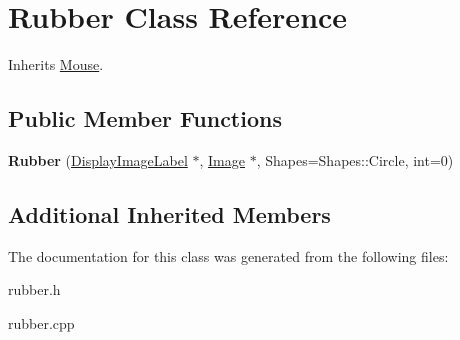 \hypertarget{class_rubber}{}\section{Rubber Class Reference}
\label{class_rubber}


Inherits \mbox{\hyperlink{class_mouse}{Mouse}}.

\subsection*{Public Member Functions}
\begin{DoxyCompactItemize}
\item 
\mbox{\label{class_rubber_ae1376529b6184c7d3a8dceeaf19278b0}} 
{\bfseries Rubber} (\mbox{\hyperlink{class_display_image_label}{Display\+Image\+Label}} $\ast$, \mbox{\hyperlink{class_image}{Image}} $\ast$, Shapes=Shapes\+::\+Circle, int=0)
\end{DoxyCompactItemize}
\subsection*{Additional Inherited Members}


The documentation for this class was generated from the following files\+:\begin{DoxyCompactItemize}
\item 
rubber.\+h\item 
rubber.\+cpp\end{DoxyCompactItemize}
